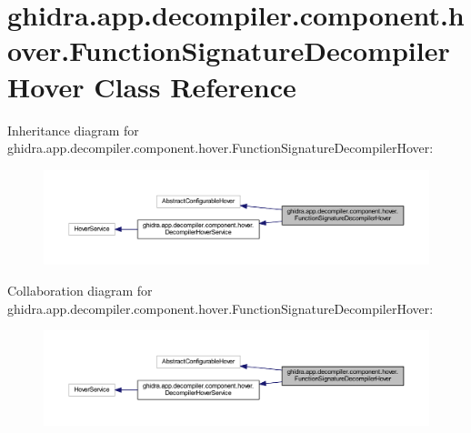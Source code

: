 \hypertarget{classghidra_1_1app_1_1decompiler_1_1component_1_1hover_1_1_function_signature_decompiler_hover}{}\section{ghidra.\+app.\+decompiler.\+component.\+hover.\+Function\+Signature\+Decompiler\+Hover Class Reference}
\label{classghidra_1_1app_1_1decompiler_1_1component_1_1hover_1_1_function_signature_decompiler_hover}


Inheritance diagram for ghidra.\+app.\+decompiler.\+component.\+hover.\+Function\+Signature\+Decompiler\+Hover\+:
\nopagebreak
\begin{figure}[H]
\begin{center}
\leavevmode
\includegraphics[width=350pt]{classghidra_1_1app_1_1decompiler_1_1component_1_1hover_1_1_function_signature_decompiler_hover__inherit__graph}
\end{center}
\end{figure}


Collaboration diagram for ghidra.\+app.\+decompiler.\+component.\+hover.\+Function\+Signature\+Decompiler\+Hover\+:
\nopagebreak
\begin{figure}[H]
\begin{center}
\leavevmode
\includegraphics[width=350pt]{classghidra_1_1app_1_1decompiler_1_1component_1_1hover_1_1_function_signature_decompiler_hover__coll__graph}
\end{center}
\end{figure}

